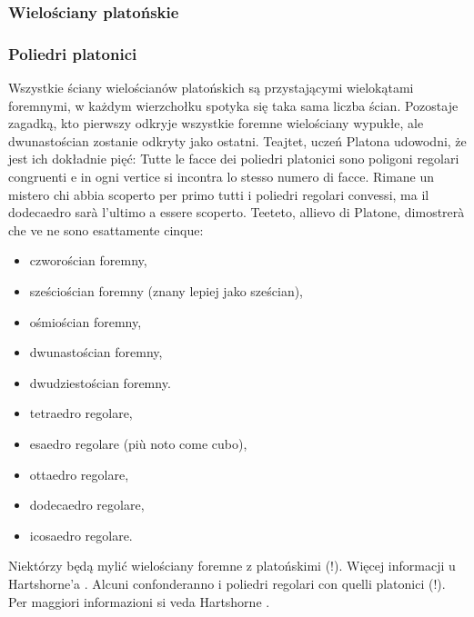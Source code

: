 
%

\subsubsection{Wielościany platońskie} %
\subsubsection{Poliedri platonici} %


Wszystkie ściany wielościanów platońskich są przystającymi wielokątami foremnymi, w każdym wierzchołku spotyka się taka sama liczba ścian. %
Pozostaje zagadką, kto pierwszy odkryje wszystkie foremne wielościany wypukłe, ale dwunastościan zostanie odkryty jako ostatni. %
Teajtet, uczeń Platona udowodni, że jest ich dokładnie pięć: %
Tutte le facce dei poliedri platonici sono poligoni regolari congruenti e in ogni vertice si incontra lo stesso numero di facce. %
Rimane un mistero chi abbia scoperto per primo tutti i poliedri regolari convessi, ma il dodecaedro sarà l'ultimo a essere scoperto. %
Teeteto, allievo di Platone, dimostrerà che ve ne sono esattamente cinque: %
\begin{itemize}
\item czworościan foremny, %
\item sześciościan foremny (znany lepiej jako sześcian), %
\item ośmiościan foremny, %
\item dwunastościan foremny, %
\item dwudziestościan foremny. %
\item tetraedro regolare, %
\item esaedro regolare (più noto come cubo), %
\item ottaedro regolare, %
\item dodecaedro regolare, %
\item icosaedro regolare. %
\end{itemize}

Niektórzy będą mylić wielościany foremne z platońskimi (!). %
Więcej informacji u Hartshorne'a \cite[rozdział 8, 45]{hartshorne_2000}. %
Alcuni confonderanno i poliedri regolari con quelli platonici (!). %
Per maggiori informazioni si veda Hartshorne \cite[capitolo 8, 45]{hartshorne_2000}. %

